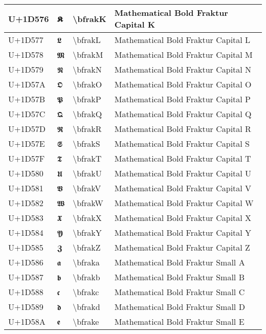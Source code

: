 \begin{table}[h]
\begin{tabulary}{\linewidth}{|L|L|L|L|}
\hline
U+1D576 & 𝕶 & {\textbackslash}bfrakK & Mathematical Bold Fraktur Capital K \\
\hline
U+1D577 & 𝕷 & {\textbackslash}bfrakL & Mathematical Bold Fraktur Capital L \\
\hline
U+1D578 & 𝕸 & {\textbackslash}bfrakM & Mathematical Bold Fraktur Capital M \\
\hline
U+1D579 & 𝕹 & {\textbackslash}bfrakN & Mathematical Bold Fraktur Capital N \\
\hline
U+1D57A & 𝕺 & {\textbackslash}bfrakO & Mathematical Bold Fraktur Capital O \\
\hline
U+1D57B & 𝕻 & {\textbackslash}bfrakP & Mathematical Bold Fraktur Capital P \\
\hline
U+1D57C & 𝕼 & {\textbackslash}bfrakQ & Mathematical Bold Fraktur Capital Q \\
\hline
U+1D57D & 𝕽 & {\textbackslash}bfrakR & Mathematical Bold Fraktur Capital R \\
\hline
U+1D57E & 𝕾 & {\textbackslash}bfrakS & Mathematical Bold Fraktur Capital S \\
\hline
U+1D57F & 𝕿 & {\textbackslash}bfrakT & Mathematical Bold Fraktur Capital T \\
\hline
U+1D580 & 𝖀 & {\textbackslash}bfrakU & Mathematical Bold Fraktur Capital U \\
\hline
U+1D581 & 𝖁 & {\textbackslash}bfrakV & Mathematical Bold Fraktur Capital V \\
\hline
U+1D582 & 𝖂 & {\textbackslash}bfrakW & Mathematical Bold Fraktur Capital W \\
\hline
U+1D583 & 𝖃 & {\textbackslash}bfrakX & Mathematical Bold Fraktur Capital X \\
\hline
U+1D584 & 𝖄 & {\textbackslash}bfrakY & Mathematical Bold Fraktur Capital Y \\
\hline
U+1D585 & 𝖅 & {\textbackslash}bfrakZ & Mathematical Bold Fraktur Capital Z \\
\hline
U+1D586 & 𝖆 & {\textbackslash}bfraka & Mathematical Bold Fraktur Small A \\
\hline
U+1D587 & 𝖇 & {\textbackslash}bfrakb & Mathematical Bold Fraktur Small B \\
\hline
U+1D588 & 𝖈 & {\textbackslash}bfrakc & Mathematical Bold Fraktur Small C \\
\hline
U+1D589 & 𝖉 & {\textbackslash}bfrakd & Mathematical Bold Fraktur Small D \\
\hline
U+1D58A & 𝖊 & {\textbackslash}bfrake & Mathematical Bold Fraktur Small E \\

\end{tabulary}
\end{table}
